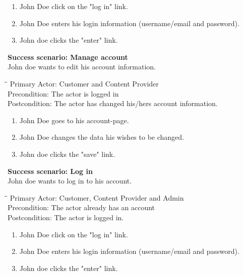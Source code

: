 \begin{enumerate} \setlength{\itemsep}{-1mm}
	\item John Doe click on the "log in" link.
	\item John Doe enters his login information (username/email and password).
	\item John doe clicks the "enter" link.
\end{enumerate}
\vspace{3mm}
\textbf{Success scenario: Manage account} \\
John doe wants to edit his account information.
\begin{tabbing}
\hspace{5mm}\=\hspace{26mm}\=\kill
\>Primary Actor:\> Customer and Content Provider\\
\>Precondition:\> The actor is logged in\\
\>Postcondition:\> The actor has changed his/hers account information.
\end{tabbing}
\begin{enumerate} \setlength{\itemsep}{-1mm}
	\item John Doe goes to his account-page.
	\item John Doe changes the data his wishes to be changed.
	\item John doe clicks the "save" link.
\end{enumerate}
\vspace{3mm}
\textbf{Success scenario: Log in} \\
John doe wants to log in to his account. 
\begin{tabbing}
\hspace{5mm}\=\hspace{26mm}\=\kill
\>Primary Actor:\> Customer, Content Provider and Admin\\
\>Precondition:\> The actor already has an account\\
\>Postcondition:\> The actor is logged in.
\end{tabbing}
\begin{enumerate} \setlength{\itemsep}{-1mm}
	\item John Doe click on the "log in" link.
	\item John Doe enters his login information (username/email and password).
	\item John doe clicks the "enter" link.
\end{enumerate}
\vspace{3mm}
